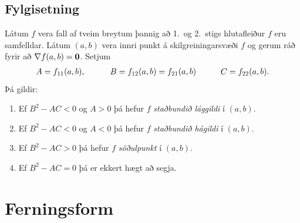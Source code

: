 \documentclass[a4paper,10pt,icelandic]{sphinxmanual}
\begin{document}
\subsection{Fylgisetning}
\label{Kafli3:fylgisetning}
Látum \(f\) vera fall af tveim breytum þannig að 1. og 2. stigs
hlutafleiður \(f\) eru samfelldar. Látum \((a,b)\) vera innri
punkt á skilgreiningarsvæði \(f\) og gerum ráð fyrir að
\(\nabla
f(a,b)=\mbox{${\bf 0}$}\). Setjum
\begin{gather}
\begin{split}A=f_{11}(a,b),\qquad\quad B=f_{12}(a,b)=f_{21}(a,b)\qquad\quad
C=f_{22}(a,b).\end{split}\notag
\end{gather}
Þá gildir:
\begin{enumerate}
\item {} 
Ef \(B^2-AC<0\) og \(A>0\) þá hefur \(f\) \textit{staðbundið
lággildi} í \((a,b)\).

\item {} 
Ef \(B^2-AC<0\) og \(A<0\) þá hefur \(f\) \textit{staðbundið
hágildi} í \((a,b)\).

\item {} 
Ef \(B^2-AC>0\) þá hefur \(f\) \textit{söðulpunkt} í \((a,b)\).

\item {} 
Ef \(B^2-AC=0\) þá er ekkert hægt að segja.

\end{enumerate}


\section{Ferningsform}
\label{Kafli3:ferningsform}
\end{document}
